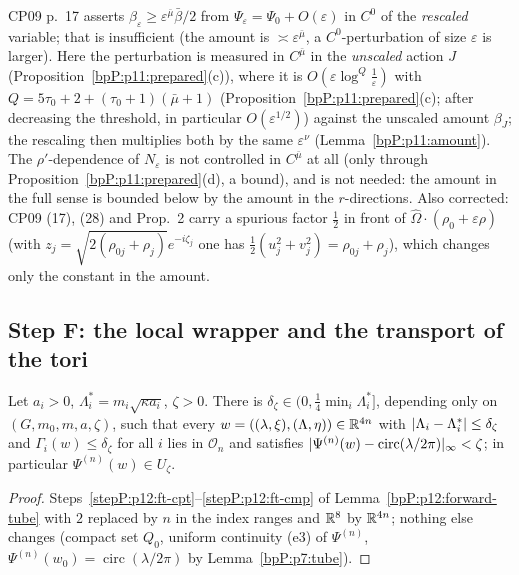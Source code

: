 \begin{remark}\label{bpP:p11:r-cp-2}
CP09 p.~17 asserts $\beta_\varepsilon\ge\varepsilon^{\bar\mu}\bar\beta/2$ from $\Psi_\varepsilon=\Psi_0+O(\varepsilon)$ in $C^0$ of the \emph{rescaled} variable; that is insufficient (the amount is $\asymp\varepsilon^{\bar\mu}$, a $C^0$-perturbation of size $\varepsilon$ is larger). Here the perturbation is measured in $C^{\bar\mu}$ in the \emph{unscaled} action $J$ (Proposition~\ref{bpP:p11:prepared}(c)), where it is $O(\varepsilon\log^{Q}\frac1\varepsilon)$ with $Q=5\tau_0+2+(\tau_0+1)(\bar\mu+1)$ (Proposition~\ref{bpP:p11:prepared}(c); after decreasing the threshold, in particular $O(\varepsilon^{1/2})$) against the unscaled amount $\beta_J$; the rescaling then multiplies both by the same $\varepsilon^\nu$ (Lemma~\ref{bpP:p11:amount}). The $\rho'$-dependence of $N_\varepsilon$ is not controlled in $C^{\bar\mu}$ at all (only through Proposition~\ref{bpP:p11:prepared}(d), a bound), and is not needed: the amount in the full sense is bounded below by the amount in the $r$-directions. Also corrected: CP09 (17), (28) and Prop.~2 carry a spurious factor $\frac12$ in front of $\hat\Omega\cdot(\rho_0+\varepsilon\rho)$ (with $z_j=\sqrt{2(\rho_{0j}+\rho_j)}e^{-i\zeta_j}$ one has $\frac12(u_j^2+v_j^2)=\rho_{0j}+\rho_j$), which changes only the constant in the amount.
\end{remark}

\subsection{Step F: the local wrapper and the transport of the tori}\label{bpP:p11:sec-F}

\begin{lemma}\label{bpP:p11:forward-tube}
Let $a_i>0$, $\Lambda_i^*=m_i\sqrt{\kappa a_i}$, $\zeta>0$. There is $\delta_\zeta\in(0,\frac14\min_i\Lambda_i^*]$, depending only on $(G,m_0,m,a,\zeta)$, such that every $w=((\lambda,\xi),(\Lambda,\eta))\in\mathbb{R}^{4n}$ with $\lvert \Lambda_i-\Lambda_i^*\rvert\le\delta_\zeta$ and $\Gamma_i(w)\le\delta_\zeta$ for all $i$ lies in $\mathcal O_n$ and satisfies $\lvert \Psi^{(n)}(w)-\operatorname{circ}(\lambda/2\pi)\rvert_\infty<\zeta$; in particular $\Psi^{(n)}(w)\in U_\zeta$.
\end{lemma}
\begin{proof}
Steps~\ref{stepP:p12:ft-cpt}--\ref{stepP:p12:ft-cmp} of Lemma~\ref{bpP:p12:forward-tube} with $2$ replaced by $n$ in the index ranges and $\mathbb{R}^8$ by $\mathbb{R}^{4n}$; nothing else changes (compact set $Q_0$, uniform continuity (e3) of $\Psi^{(n)}$, $\Psi^{(n)}(w_0)=\operatorname{circ}(\lambda/2\pi)$ by Lemma~\ref{bpP:p7:tube}).
\end{proof}

